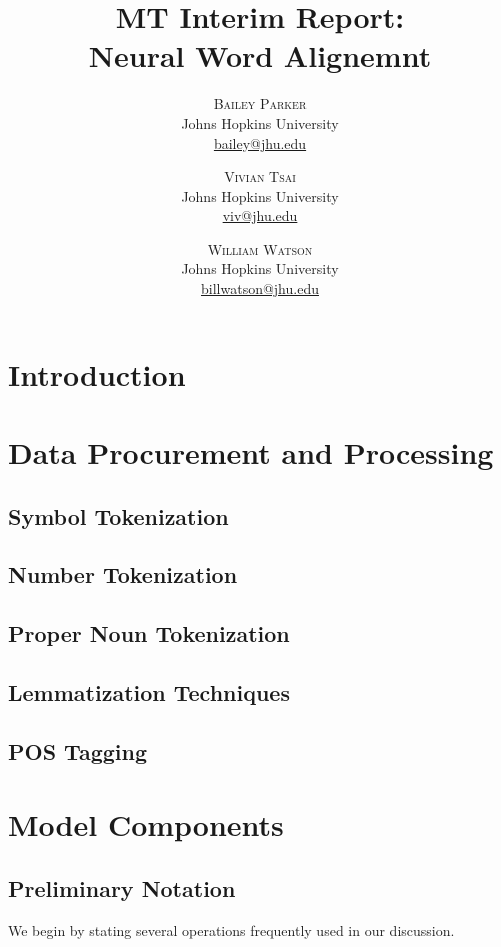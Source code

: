 \documentclass[twoside,twocolumn]{article}
\title{MT Interim Report: \\ Neural Word Alignemnt}
\author{%
\textsc{Bailey Parker} \\[1ex]
\normalsize Johns Hopkins University \\
\normalsize \href{mailto:bailey@jhu.edu}{bailey@jhu.edu}
 \and
 \textsc{Vivian Tsai} \\[1ex]
\normalsize Johns Hopkins University \\
\normalsize \href{mailto:viv@jhu.edu}{viv@jhu.edu}
 \and
  \textsc{William Watson} \\[1ex]
\normalsize Johns Hopkins University \\
\normalsize \href{mailto:billwatson@jhu.edu}{billwatson@jhu.edu}
}
\date{}
\begin{document}
\maketitle




\begin{abstract}
\end{abstract}

\section{Introduction}

\section{Data Procurement and Processing}
\subsection{Symbol Tokenization}
\subsection{Number Tokenization}
\subsection{Proper Noun Tokenization}
\subsection{Lemmatization Techniques}
\subsection{POS Tagging}

\section{Model Components}
\subsection{Preliminary Notation}
We begin by stating several operations frequently used in our discussion.
\end{document}
